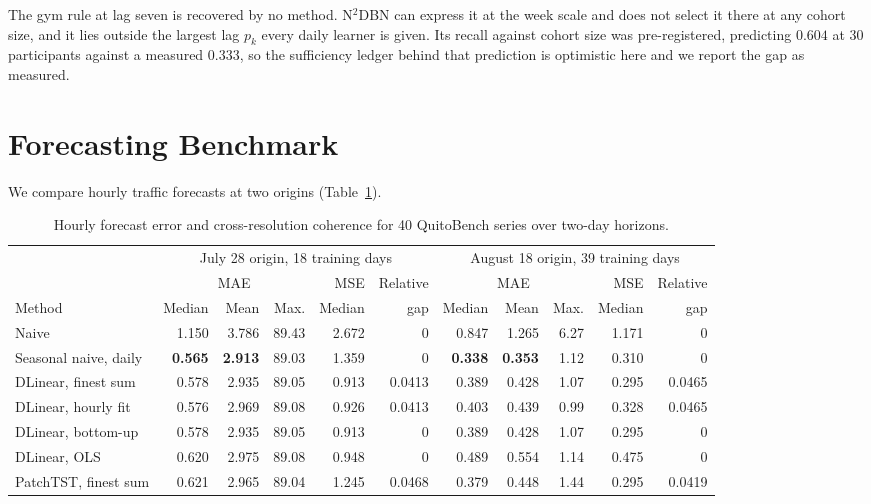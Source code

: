 \documentclass[sigconf]{acmart}
\begin{document}
The gym rule at lag seven is recovered by no method. N$^2$DBN can express it at the week scale and does not select it there at any cohort size, and it lies outside the largest lag $p_k$ every daily learner is given. Its recall against cohort size was pre-registered, predicting $0.604$ at $30$ participants against a measured $0.333$, so the sufficiency ledger behind that prediction is optimistic here and we report the gap as measured.

\section{Forecasting Benchmark}
\label{sec:exp:forecast}

We compare hourly traffic forecasts at two origins (Table~\ref{tab:exp-forecast}).

\begin{table}[t]
\caption{Hourly forecast error and cross-resolution coherence for 40 QuitoBench series over two-day horizons.}
\label{tab:exp-forecast}
\centering
\small
\begin{threeparttable}
\begin{tabular}{lrrrrr@{\hspace{1.6em}}rrrrr}
\toprule
 & \multicolumn{5}{c}{July 28 origin, 18 training days} & \multicolumn{5}{c}{August 18 origin, 39 training days} \\
\cmidrule(lr){2-6}\cmidrule(lr){7-11}
 & \multicolumn{3}{c}{MAE} & MSE & Relative & \multicolumn{3}{c}{MAE} & MSE & Relative \\
Method & Median & Mean & Max. & Median & gap & Median & Mean & Max. & Median & gap \\
\midrule
Naive & 1.150 & 3.786 & 89.43 & 2.672 & 0 & 0.847 & 1.265 & 6.27 & 1.171 & 0 \\
Seasonal naive, daily & \textbf{0.565} & \textbf{2.913} & 89.03 & 1.359 & 0 & \textbf{0.338} & \textbf{0.353} & 1.12 & 0.310 & 0 \\
DLinear, finest sum & 0.578 & 2.935 & 89.05 & 0.913 & 0.0413 & 0.389 & 0.428 & 1.07 & 0.295 & 0.0465 \\
DLinear, hourly fit & 0.576 & 2.969 & 89.08 & 0.926 & 0.0413 & 0.403 & 0.439 & 0.99 & 0.328 & 0.0465 \\
DLinear, bottom-up & 0.578 & 2.935 & 89.05 & 0.913 & 0 & 0.389 & 0.428 & 1.07 & 0.295 & 0 \\
DLinear, OLS & 0.620 & 2.975 & 89.08 & 0.948 & 0 & 0.489 & 0.554 & 1.14 & 0.475 & 0 \\
PatchTST, finest sum & 0.621 & 2.965 & 89.04 & 1.245 & 0.0468 & 0.379 & 0.448 & 1.44 & 0.295 & 0.0419 \\

\end{tabular}
\end{threeparttable}
\end{table}
\end{document}
